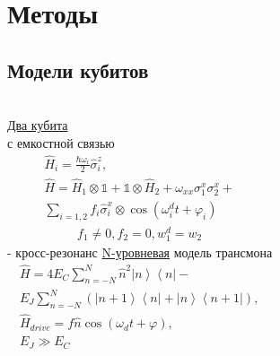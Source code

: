 \documentclass[aspectratio=169, 13pt]{beamer}
\begin{document}
\section{Методы}

\subsection{Модели кубитов}
\begin{frame}[c]\frametitle{\secname}\framesubtitle{\subsecname}
\begin{columns}[c]
\centering
\underline{Два кубита}\\ 
с емкостной связью
\begin{gather*}
\hat{H}_i = \frac{ \hbar \omega_i }{2} \hat \sigma_i^z,\\
\hat{H} = \hat{H}_1 \otimes \mathbb{1} + \mathbb{1} \otimes \hat{H}_2 + \omega_{xx} \sigma^x_1 \sigma^x_2 + \\
\sum_{i = 1,2} f_i  \hat{\sigma}^x_i \otimes  \cos \left( \omega^d_i t + \varphi_i \right) 
\end{gather*}
\begin{gather*}
f_1 \neq 0, f_2 = 0, w^d_1 = w_2 
\end{gather*}
- кросс-резонанс
\centering
\underline{N-уровневая}  модель трансмона 
\begin{gather*}
\hat{H} = 4 E_C \sum_{n = -N}^{N}\hat n ^2 \left| n \right>\left< n \right|  - \\
E_J \sum_{n = -N}^{N}
\left( 
\left| n+1 \right>\left< n   \right| +
\left| n   \right>\left< n+1 \right|
\right), \\
\hat{H}_{drive} = f \hat{n} \cos \left( \omega_d t + \varphi\right),\\
E_J \gg E_C
\end{gather*}

\end{columns}

\end{frame}
\end{document}
